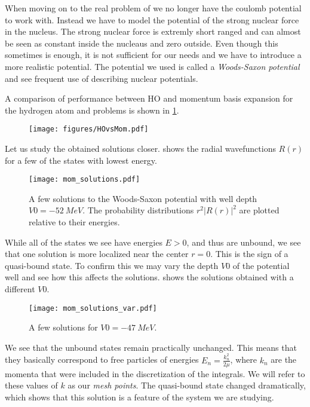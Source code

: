 
When moving on to the real problem of  we no longer have the coulomb potential to work with.
Instead we have to model the potential of the strong nuclear force in the  nucleus.
The strong nuclear force is extremly short ranged and can almost be seen as constant inside the nucleaus and zero outside.
Even though this sometimes is enough, it is not sufficient for our needs and we have to introduce a more realistic potential.
The potential we used is called a \emph{Woods-Saxon potential} and see frequent use of describing nuclear potentials.


A comparison of performance between HO and momentum basis expansion for the hydrogen atom and  problems is shown in \cref{fig:HO vs mom}.
\begin{figure}
  \centering
    \texttt{[image: figures/HOvsMom.pdf]}
  \caption{}
  \label{fig:HO vs mom}
\end{figure}

Let us study the obtained solutions closer.  shows the radial wavefunctions $R(r)$ for a few of the states with lowest energy.

\begin{figure}
  \centering
  \texttt{[image: mom\_solutions.pdf]}
  \caption{A few solutions to the Woods-Saxon potential with well depth $V0=\SI{-52}{MeV}$. The probability distributions $r^2|R(r)|^2$ are plotted relative to their energies. }
  \label{fig:momspace solutions}
\end{figure}

 While all of the states we see have energies $E>0$, and thus are unbound, we see that one solution is more localized near the center $r=0$. This is the sign of a quasi-bound state. To confirm this we may vary the depth $V0$ of the potential well and see how this affects the solutions.  shows the solutions obtained with a different $V0$.
\begin{figure}
  \centering
  \texttt{[image: mom\_solutions\_var.pdf]}
  \caption{A few solutions for $V0=\SI{-47}{MeV}$.}
  \label{fig:momspace solutions var}
\end {figure}
We see that the unbound states remain practically unchanged. This means that they basically correspond to free particles of energies $E_n=\frac{k_n^2}{2\mu}$, where $k_n$ are the momenta that were included in the discretization of the integrals. We will refer to these values of $k$ as our \emph{mesh points}. The quasi-bound state changed dramatically, which shows that this solution is a feature of the system we are studying.  
